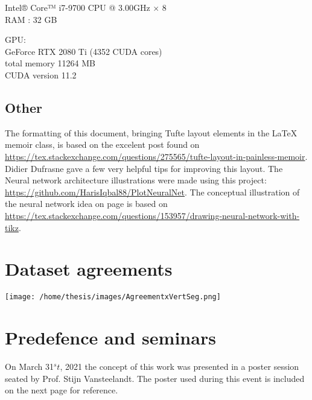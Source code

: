 Intel® Core™ i7-9700 CPU @ 3.00GHz $\times$ 8 \\
RAM : 32 GB

\textsc{GPU}:\\
\hspace{5mm}GeForce RTX 2080 Ti (4352 CUDA cores)\\
\hspace{5mm}total memory 11264 MB\\
\hspace{5mm}CUDA version 11.2



\section{Other}
The formatting of this document, bringing Tufte layout elements in the \LaTeX{} memoir class, is based on the excelent post found on \url{https://tex.stackexchange.com/questions/275565/tufte-layout-in-painless-memoir}.
Didier Dufrasne gave a few very helpful tips for improving this layout.
The Neural network architecture illustrations were made using this project: \url{https://github.com/HarisIqbal88/PlotNeuralNet}.
The conceptual illustration of the neural network idea on page \pageref{fig:ann} is based on \url{https://tex.stackexchange.com/questions/153957/drawing-neural-network-with-tikz}.



\chapter{Dataset agreements\label{seg:datasetagreement}}

\texttt{[image: /home/thesis/images/AgreementxVertSeg.png]}

\chapter{Predefence and seminars}
\par{
  On March 31$^st$, 2021 the concept of this work was presented in a poster session seated by Prof. Stijn Vansteelandt.
The poster used during this event is included on the next page for reference.
}





